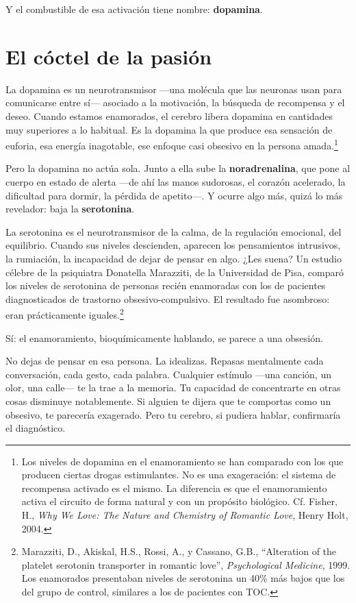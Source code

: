 Y el combustible de esa activación tiene nombre: \textbf{dopamina}.

\section{El cóctel de la pasión}

La dopamina es un neurotransmisor ---una molécula que las neuronas usan para comunicarse entre sí--- asociado a la motivación, la búsqueda de recompensa y el deseo. Cuando estamos enamorados, el cerebro libera dopamina en cantidades muy superiores a lo habitual. Es la dopamina la que produce esa sensación de euforia, esa energía inagotable, ese enfoque casi obsesivo en la persona amada.\footnote{Los niveles de dopamina en el enamoramiento se han comparado con los que producen ciertas drogas estimulantes. No es una exageración: el sistema de recompensa activado es el mismo. La diferencia es que el enamoramiento activa el circuito de forma natural y con un propósito biológico. Cf. Fisher, H., \textit{Why We Love: The Nature and Chemistry of Romantic Love}, Henry Holt, 2004.}

Pero la dopamina no actúa sola. Junto a ella sube la \textbf{noradrenalina}, que pone al cuerpo en estado de alerta ---de ahí las manos sudorosas, el corazón acelerado, la dificultad para dormir, la pérdida de apetito---. Y ocurre algo más, quizá lo más revelador: baja la \textbf{serotonina}.

La serotonina es el neurotransmisor de la calma, de la regulación emocional, del equilibrio. Cuando sus niveles descienden, aparecen los pensamientos intrusivos, la rumiación, la incapacidad de dejar de pensar en algo. ¿Les suena? Un estudio célebre de la psiquiatra Donatella Marazziti, de la Universidad de Pisa, comparó los niveles de serotonina de personas recién enamoradas con los de pacientes diagnosticados de trastorno obsesivo-compulsivo. El resultado fue asombroso: eran prácticamente iguales.\footnote{Marazziti, D., Akiskal, H.S., Rossi, A., y Cassano, G.B., ``Alteration of the platelet serotonin transporter in romantic love'', \textit{Psychological Medicine}, 1999. Los enamorados presentaban niveles de serotonina un 40\% más bajos que los del grupo de control, similares a los de pacientes con TOC.}

Sí: el enamoramiento, bioquímicamente hablando, se parece a una obsesión.

No dejas de pensar en esa persona. La idealizas. Repasas mentalmente cada conversación, cada gesto, cada palabra. Cualquier estímulo ---una canción, un olor, una calle--- te la trae a la memoria. Tu capacidad de concentrarte en otras cosas disminuye notablemente. Si alguien te dijera que te comportas como un obsesivo, te parecería exagerado. Pero tu cerebro, si pudiera hablar, confirmaría el diagnóstico.

